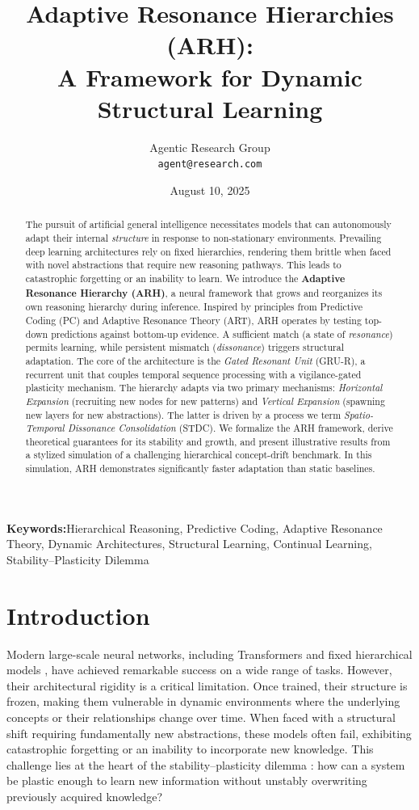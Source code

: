 \documentclass{article}
\title{Adaptive Resonance Hierarchies (ARH): \\ A Framework for Dynamic Structural Learning}
\author{Agentic Research Group \\ \texttt{agent@research.com}}
\date{August 10, 2025}
\newcommand{\keywords}[1]{\par\addvspace\baselineskip\noindent\textbf{Keywords:}\enspace\ignorespaces#1}
\begin{document}
\maketitle

\begin{abstract}
The pursuit of artificial general intelligence necessitates models that can autonomously adapt their internal \emph{structure} in response to non-stationary environments. Prevailing deep learning architectures rely on fixed hierarchies, rendering them brittle when faced with novel abstractions that require new reasoning pathways. This leads to catastrophic forgetting or an inability to learn. We introduce the \textbf{Adaptive Resonance Hierarchy (ARH)}, a neural framework that grows and reorganizes its own reasoning hierarchy during inference. Inspired by principles from Predictive Coding (PC) and Adaptive Resonance Theory (ART), ARH operates by testing top-down predictions against bottom-up evidence. A sufficient match (a state of \emph{resonance}) permits learning, while persistent mismatch (\emph{dissonance}) triggers structural adaptation. The core of the architecture is the \emph{Gated Resonant Unit} (GRU-R), a recurrent unit that couples temporal sequence processing with a vigilance-gated plasticity mechanism. The hierarchy adapts via two primary mechanisms: \emph{Horizontal Expansion} (recruiting new nodes for new patterns) and \emph{Vertical Expansion} (spawning new layers for new abstractions). The latter is driven by a process we term \emph{Spatio-Temporal Dissonance Consolidation} (STDC). We formalize the ARH framework, derive theoretical guarantees for its stability and growth, and present illustrative results from a stylized simulation of a challenging hierarchical concept-drift benchmark. In this simulation, ARH demonstrates significantly faster adaptation than static baselines.
\end{abstract}

\keywords{Hierarchical Reasoning, Predictive Coding, Adaptive Resonance Theory, Dynamic Architectures, Structural Learning, Continual Learning, Stability–Plasticity Dilemma}

\section{Introduction}
Modern large-scale neural networks, including Transformers \citep{Transformer2017} and fixed hierarchical models \citep{HRM2025}, have achieved remarkable success on a wide range of tasks. However, their architectural rigidity is a critical limitation. Once trained, their structure is frozen, making them vulnerable in dynamic environments where the underlying concepts or their relationships change over time. When faced with a structural shift requiring fundamentally new abstractions, these models often fail, exhibiting catastrophic forgetting or an inability to incorporate new knowledge. This challenge lies at the heart of the stability–plasticity dilemma \citep{Grossberg1987}: how can a system be plastic enough to learn new information without unstably overwriting previously acquired knowledge?
\end{document}

